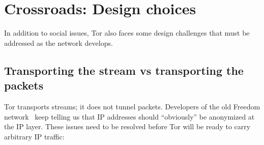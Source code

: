 \documentclass{llncs}
\begin{document}


\section{Crossroads: Design choices}
\label{sec:crossroads-design}

In addition to social issues, Tor also faces some design challenges that must
be addressed as the network develops.

\subsection{Transporting the stream vs transporting the packets}
\label{subsec:stream-vs-packet}
\label{subsec:tcp-vs-ip}

Tor transports streams; it does not tunnel packets.
Developers of the old Freedom network~\cite{freedom21-security}
keep telling us that IP addresses should ``obviously'' be anonymized
at the IP layer. These issues need to be resolved before
Tor will be ready to carry arbitrary IP traffic:
\end{document}
